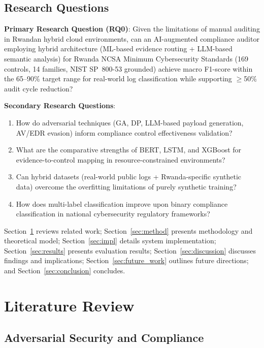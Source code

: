 \documentclass[futureinternet,article,submit,pdftex,moreauthors]{Definitions/mdpi}
\begin{document}
\subsection{Research Questions}

\textbf{Primary Research Question (RQ0)}: Given the limitations of manual auditing in Rwandan
hybrid cloud environments, can an AI-augmented compliance auditor employing hybrid architecture
(ML-based evidence routing + LLM-based semantic analysis) for Rwanda NCSA Minimum
Cybersecurity Standards (169 controls, 14 families, NIST SP~800-53 grounded) achieve
macro F1-score within the 65--90\% target range for real-world log
classification while supporting $\geq$50\% audit cycle reduction?

\textbf{Secondary Research Questions}:
\begin{enumerate}
\item[\textbf{RQ1}] How do adversarial techniques (GA, DP, LLM-based payload generation,
AV/EDR evasion) inform compliance control effectiveness validation?
\item[\textbf{RQ2}] What are the comparative strengths of BERT, LSTM, and XGBoost for
evidence-to-control mapping in resource-constrained environments?
\item[\textbf{RQ3}] Can hybrid datasets (real-world public logs + Rwanda-specific synthetic
data) overcome the overfitting limitations of purely synthetic training?
\item[\textbf{RQ4}] How does multi-label classification improve upon binary compliance
classification in national cybersecurity regulatory frameworks?
\end{enumerate}

Section~\ref{sec:lit} reviews related work; Section~\ref{sec:method} presents methodology
and theoretical model; Section~\ref{sec:impl} details system implementation;
Section~\ref{sec:results} presents evaluation results; Section~\ref{sec:discussion} discusses
findings and implications; Section~\ref{sec:future_work} outlines future directions; and
Section~\ref{sec:conclusion} concludes.

\section{Literature Review}
\label{sec:lit}

\subsection{Adversarial Security and Compliance}
\end{document}
